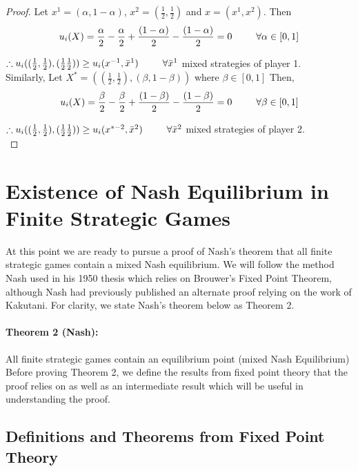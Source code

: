 \documentclass[12pt]{article}
\newcommand{\tab}{\hspace*{25pt}}
\begin{document}
\begin{proof}
Let $x^1 = (\alpha, 1 - \alpha)$, $x^2 = (\frac{1}{2},\frac{1}{2})$ and $ x = (x^1,x^2)$. Then
\begin{equation*}
u_i(X) = \frac{\alpha}{2} - \frac{\alpha}{2} + \frac{(1-\alpha)}{2} - \frac{(1-\alpha)}{2} = 0 \tab \forall \alpha \in [0,1]
\end{equation*} 

$\therefore u_i((\frac{1}{2},\frac{1}{2}), (\frac{1}{2} \frac{1}{2})) \geq u_i(x^{-1},\bar{x}^{1}) \tab \forall \bar{x}^1$ mixed strategies of player 1.\\

Similarly, Let $X^* = ((\frac{1}{2},\frac{1}{2}), (\beta,1-\beta))$ where $\beta \in [0,1]$ Then,
\begin{equation*}
u_i(X) = \frac{\beta}{2} - \frac{\beta}{2} + \frac{(1-\beta)}{2} - \frac{(1-\beta)}{2} = 0 \tab \forall \beta \in [0,1]
\end{equation*}

$\therefore u_i((\frac{1}{2},\frac{1}{2}), (\frac{1}{2} \frac{1}{2})) \geq u_i(x^{*-2},\bar{x}^{2}) \tab \forall \bar{x}^2$ mixed strategies of player 2.\\ 
\end{proof}

\section{Existence of Nash Equilibrium in Finite Strategic Games}

At this point we are ready to pursue a proof of Nash’s theorem that all finite strategic games contain a mixed Nash equilibrium. We will follow the method Nash used in his 1950 thesis which relies on Brouwer’s Fixed Point Theorem, although Nash had previously published an alternate proof relying on the work of Kakutani. For clarity, we state Nash’s theorem below as Theorem 2.

\paragraph{Theorem 2 (Nash):} All finite strategic games contain an equilibrium point (mixed Nash Equilibrium)\\

Before proving Theorem 2, we define the results from fixed point theory that the proof relies on as well as an intermediate result which will be useful in understanding the proof.

\subsection{Definitions and Theorems from Fixed Point Theory}
\end{document}
